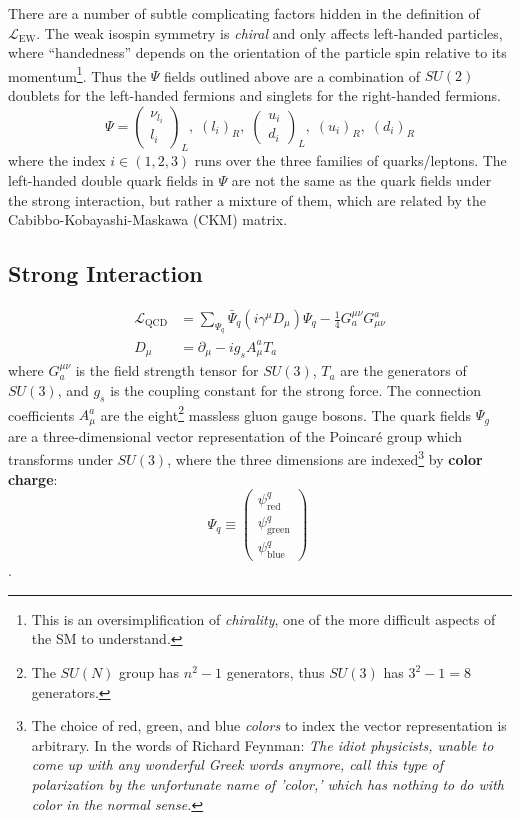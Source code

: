 There are a number of subtle complicating factors hidden in the definition of $\mathcal{L}_{\mathrm{EW}}$.
The weak isospin symmetry is \textit{chiral} and only affects left-handed particles, where ``handedness'' depends on the orientation of the particle spin relative to its momentum\footnote{This is an oversimplification of \textit{chirality}, one of the more difficult aspects of the SM to understand.}.
Thus the $\Psi$ fields outlined above are a combination of $SU(2)$ doublets for the left-handed fermions and singlets for the right-handed fermions.
\begin{equation}
    \Psi = \begin{pmatrix}
           \nu_{l_i} \\
           l_i
         \end{pmatrix}_L,\;
         (l_i)_R,\;
    \begin{pmatrix}
           u_i \\
           d_i
        \end{pmatrix}_L,\;
        (u_i)_R,\; (d_i)_R
\end{equation}
where the index $i \in (1,2,3)$ runs over the three families of quarks/leptons.
The left-handed double quark fields in $\Psi$ are not the same as the quark fields under the strong interaction, but rather a mixture of them, which are related by the Cabibbo-Kobayashi-Maskawa (CKM) matrix. %

\subsection{Strong Interaction}

\begin{align}
    \mathcal{L}_{\mathrm{QCD}} &= \sum_{\Psi_q}  \bar{\Psi}_q  (i \gamma^\mu D_\mu) \Psi_q - \frac{1}{4} G_a^{\mu\nu} G^a_{\mu\nu} \\
    D_\mu &= \partial_\mu - i g_s A_\mu^a T_a
\end{align}
where $G_a^{\mu\nu}$ is the field strength tensor for $SU(3)$, $T_a$ are the generators of $SU(3)$, and $g_s$ is the coupling constant for the strong force.
The connection coefficients $A_\mu^a$ are the eight\footnote{The $SU(N)$ group has $n^2-1$ generators, thus $SU(3)$ has $3^2 - 1 = 8$ generators.} massless gluon gauge bosons.
The quark fields $\Psi_g$ are a three-dimensional vector representation of the Poincar\'{e} group which transforms under $SU(3)$, where the three dimensions are indexed\footnote{The choice of red, green, and blue \textit{colors} to index the vector representation is arbitrary. In the words of Richard Feynman: \textit{The idiot physicists, unable to come up with any wonderful Greek words anymore, call this type of polarization by the unfortunate name of 'color,' which has nothing to do with color in the normal sense.}} by \textbf{color charge}:
\begin{equation}
    \Psi_q \equiv 
    \begin{pmatrix}
    \psi^q_{\mathrm{red}} \\
    \psi^q_{\mathrm{green}} \\
    \psi^q_{\mathrm{blue}}
    \end{pmatrix}\;
\end{equation}.

